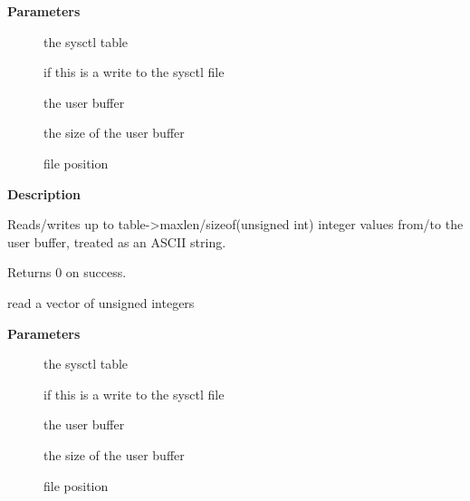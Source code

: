 \documentclass[a4paper,8pt,english]{sphinxmanual}
\begin{document}
\textbf{Parameters}
\begin{description}
\item[{}] \leavevmode
the sysctl table

\item[{}] \leavevmode
{} if this is a write to the sysctl file

\item[{}] \leavevmode
the user buffer

\item[{}] \leavevmode
the size of the user buffer

\item[{}] \leavevmode
file position

\end{description}

\textbf{Description}

Reads/writes up to table-\textgreater{}maxlen/sizeof(unsigned int) integer
values from/to the user buffer, treated as an ASCII string.

Returns 0 on success.

\begin{fulllineitems}
\label{filesystems/index:c.proc_douintvec}
read a vector of unsigned integers

\end{fulllineitems}


\textbf{Parameters}
\begin{description}
\item[{}] \leavevmode
the sysctl table

\item[{}] \leavevmode
{} if this is a write to the sysctl file

\item[{}] \leavevmode
the user buffer

\item[{}] \leavevmode
the size of the user buffer

\item[{}] \leavevmode
file position

\end{description}
\end{document}
